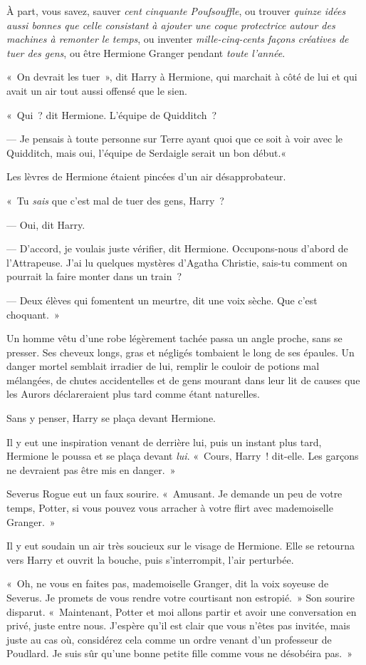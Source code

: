 À part, vous savez, sauver \emph{cent cinquante Poufsouffle}, ou trouver \emph{quinze idées aussi bonnes que celle consistant à ajouter une coque protectrice autour des machines à remonter le temps}, ou inventer \emph{mille-cinq-cents façons créatives de tuer des gens}, ou être Hermione Granger pendant \emph{toute l'année}.

«~On devrait les tuer~», dit Harry à Hermione, qui marchait à côté de lui et qui avait un air tout aussi offensé que le sien.

«~Qui~? dit Hermione. L'équipe de Quidditch~?

--- Je pensais à toute personne sur Terre ayant quoi que ce soit à voir avec le Quidditch, mais oui, l'équipe de Serdaigle serait un bon début.«~

Les lèvres de Hermione étaient pincées d'un air désapprobateur.

«~Tu \emph{sais} que c'est mal de tuer des gens, Harry~?

--- Oui, dit Harry.

--- D'accord, je voulais juste vérifier, dit Hermione. Occupons-nous d'abord de l'Attrapeuse. J'ai lu quelques mystères d'Agatha Christie, sais-tu comment on pourrait la faire monter dans un train~?

--- Deux élèves qui fomentent un meurtre, dit une voix sèche. Que c'est choquant.~»

Un homme vêtu d’une robe légèrement tachée passa un angle proche, sans se presser. Ses cheveux longs, gras et négligés tombaient le long de ses épaules. Un danger mortel semblait irradier de lui, remplir le couloir de potions mal mélangées, de chutes accidentelles et de gens mourant dans leur lit de causes que les Aurors déclareraient plus tard comme étant naturelles.

Sans y penser, Harry se plaça devant Hermione.

Il y eut une inspiration venant de derrière lui, puis un instant plus tard, Hermione le poussa et se plaça devant \emph{lui}. «~Cours, Harry~! dit-elle. Les garçons ne devraient pas être mis en danger.~»

Severus Rogue eut un faux sourire. «~Amusant. Je demande un peu de votre temps, Potter, si vous pouvez vous arracher à votre flirt avec mademoiselle Granger.~»

Il y eut soudain un air très soucieux sur le visage de Hermione. Elle se retourna vers Harry et ouvrit la bouche, puis s'interrompit, l'air perturbée.

«~Oh, ne vous en faites pas, mademoiselle Granger, dit la voix soyeuse de Severus. Je promets de vous rendre votre courtisant non estropié.~» Son sourire disparut. «~Maintenant, Potter et moi allons partir et avoir une conversation en privé, juste entre nous. J'espère qu'il est clair que vous n'êtes pas invitée, mais juste au cas où, considérez cela comme un ordre venant d'un professeur de Poudlard. Je suis sûr qu'une bonne petite fille comme vous ne désobéira pas.~»

